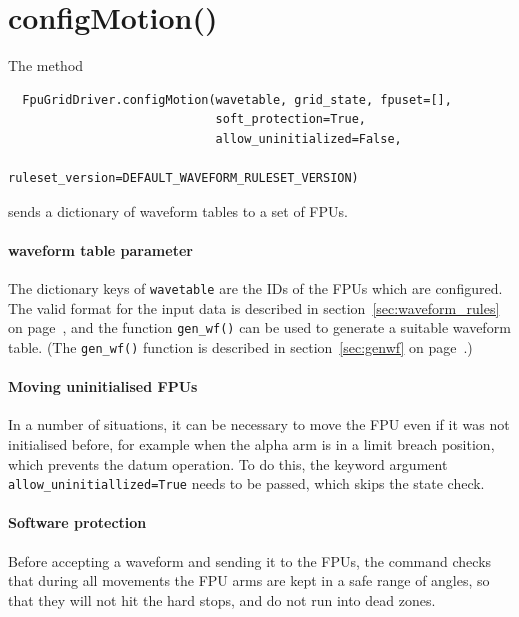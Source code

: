\documentclass[fontsize=12,a4paper]{scrreprt}
\begin{document}
\minitoc


\section{configMotion()}
\label{sec:configmotion}
  The method
\begin{verbatim}
  FpuGridDriver.configMotion(wavetable, grid_state, fpuset=[],
                             soft_protection=True,
                             allow_uninitialized=False,
                             ruleset_version=DEFAULT_WAVEFORM_RULESET_VERSION)
\end{verbatim}
sends a dictionary of waveform tables to a set of FPUs.

\paragraph{waveform table parameter}

The dictionary keys of \texttt{wavetable} are the IDs of the FPUs
which are configured. The valid format for the input data is described
in section~\ref{sec:waveform_rules} on
page~\pageref{sec:waveform_rules}, and the function \texttt{gen\_wf()}
can be used to generate a suitable waveform table. (The
\texttt{gen\_wf()} function is described in section~\ref{sec:genwf} on
page~\pageref{sec:genwf}.)


\paragraph{Moving uninitialised FPUs}

In a number of situations, it can be necessary to move the FPU even if
it was not initialised before, for example when the alpha arm is in a
limit breach position, which prevents the datum operation. To do this,
the keyword argument \texttt{allow\_uninitiallized=True} needs to be passed,
which skips the state check.

\paragraph{Software protection}
 Before accepting a waveform and sending it
to the FPUs, the command checks that during all movements the FPU arms
are kept in a safe range of angles, so that they will not hit the hard
stops, and do not run into dead zones.
\end{document}

